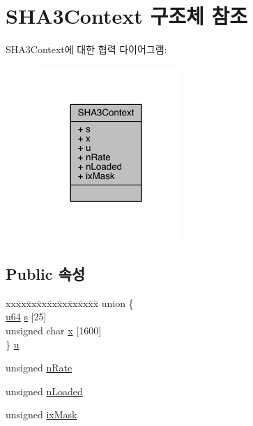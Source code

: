 \hypertarget{struct_s_h_a3_context}{}\section{S\+H\+A3\+Context 구조체 참조}
\label{struct_s_h_a3_context}


S\+H\+A3\+Context에 대한 협력 다이어그램\+:
\nopagebreak
\begin{figure}[H]
\begin{center}
\leavevmode
\includegraphics[width=156pt]{struct_s_h_a3_context__coll__graph}
\end{center}
\end{figure}
\subsection*{Public 속성}
\begin{DoxyCompactItemize}
\item 
\begin{tabbing}
xx\=xx\=xx\=xx\=xx\=xx\=xx\=xx\=xx\=\kill
union \{\\
\>\hyperlink{shell_8c_a510e88e5fe50c5bcf5b3ff1ad131e109}{u64} \hyperlink{struct_s_h_a3_context_ac353f0d611651d2f23a0da1223950f8a}{s} \mbox{[}25\mbox{]}\\
\>unsigned char \hyperlink{struct_s_h_a3_context_afed763dce136f918c20ad99a8ec28adc}{x} \mbox{[}1600\mbox{]}\\
\} \hyperlink{struct_s_h_a3_context_a9b772ee291e315531a1e88688ff82b69}{u}\\

\end{tabbing}\item 
unsigned \hyperlink{struct_s_h_a3_context_a22fc5e072ef8924400267fee73dfb23f}{n\+Rate}
\item 
unsigned \hyperlink{struct_s_h_a3_context_aa4e83212aa13ac9f1eb3e42f831da090}{n\+Loaded}
\item 
unsigned \hyperlink{struct_s_h_a3_context_a970ac15a9c7454ff82f81f9764e3ff4d}{ix\+Mask}
\end{DoxyCompactItemize}



